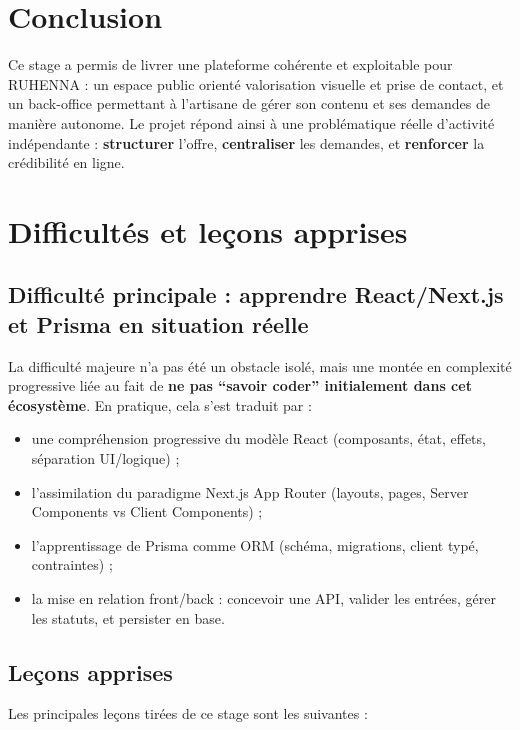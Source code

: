 \section{Conclusion}
Ce stage a permis de livrer une plateforme cohérente et exploitable pour RUHENNA : un espace public orienté valorisation visuelle et prise de contact, et un back-office permettant à l’artisane de gérer son contenu et ses demandes de manière autonome. Le projet répond ainsi à une problématique réelle d’activité indépendante : \textbf{structurer} l’offre, \textbf{centraliser} les demandes, et \textbf{renforcer} la crédibilité en ligne.

\section{Difficultés et leçons apprises}

\subsection{Difficulté principale : apprendre React/Next.js et Prisma en situation réelle}
La difficulté majeure n’a pas été un obstacle isolé, mais une montée en complexité progressive liée au fait de \textbf{ne pas “savoir coder” initialement dans cet écosystème}. En pratique, cela s’est traduit par :
\begin{itemize}
    \item une compréhension progressive du modèle React (composants, état, effets, séparation UI/logique) ;
    \item l’assimilation du paradigme Next.js App Router (layouts, pages, Server Components vs Client Components) ;
    \item l’apprentissage de Prisma comme ORM (schéma, migrations, client typé, contraintes) ;
    \item la mise en relation front/back : concevoir une API, valider les entrées, gérer les statuts, et persister en base.
\end{itemize}

\subsection{Leçons apprises}
Les principales leçons tirées de ce stage sont les suivantes :

